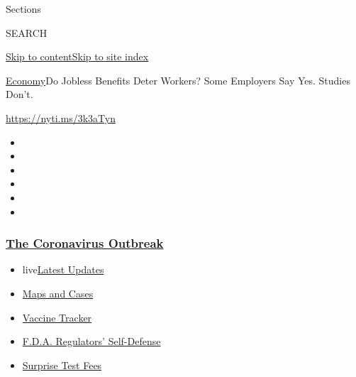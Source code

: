 Sections

SEARCH

\protect\hyperlink{site-content}{Skip to
content}\protect\hyperlink{site-index}{Skip to site index}

\href{/section/business/economy}{Economy}\textbar{}Do Jobless Benefits
Deter Workers? Some Employers Say Yes. Studies Don't.

\url{https://nyti.ms/3k3aTyn}

\begin{itemize}
\item
\item
\item
\item
\item
\item
\end{itemize}

\hypertarget{the-coronavirus-outbreak}{%
\subsubsection{\texorpdfstring{\href{https://www.nytimes3xbfgragh.onion/news-event/coronavirus?name=styln-coronavirus-markets\&region=TOP_BANNER\&block=storyline_menu_recirc\&action=click\&pgtype=Article\&impression_id=52916d50-f52c-11ea-a92a-d1075f6219dd\&variant=undefined}{The
Coronavirus
Outbreak}}{The Coronavirus Outbreak}}\label{the-coronavirus-outbreak}}

\begin{itemize}
\tightlist
\item
  live\href{https://www.nytimes3xbfgragh.onion/2020/09/12/world/covid-19-coronavirus.html?name=styln-coronavirus-markets\&region=TOP_BANNER\&block=storyline_menu_recirc\&action=click\&pgtype=Article\&impression_id=52919460-f52c-11ea-a92a-d1075f6219dd\&variant=undefined}{Latest
  Updates}
\item
  \href{https://www.nytimes3xbfgragh.onion/interactive/2020/us/coronavirus-us-cases.html?name=styln-coronavirus-markets\&region=TOP_BANNER\&block=storyline_menu_recirc\&action=click\&pgtype=Article\&impression_id=52919461-f52c-11ea-a92a-d1075f6219dd\&variant=undefined}{Maps
  and Cases}
\item
  \href{https://www.nytimes3xbfgragh.onion/interactive/2020/science/coronavirus-vaccine-tracker.html?name=styln-coronavirus-markets\&region=TOP_BANNER\&block=storyline_menu_recirc\&action=click\&pgtype=Article\&impression_id=52919462-f52c-11ea-a92a-d1075f6219dd\&variant=undefined}{Vaccine
  Tracker}
\item
  \href{https://www.nytimes3xbfgragh.onion/2020/09/10/us/politics/fda-coronavirus-vaccine.html?name=styln-coronavirus-markets\&region=TOP_BANNER\&block=storyline_menu_recirc\&action=click\&pgtype=Article\&impression_id=52919463-f52c-11ea-a92a-d1075f6219dd\&variant=undefined}{F.D.A.
  Regulators' Self-Defense}
\item
  \href{https://www.nytimes3xbfgragh.onion/2020/09/09/upshot/coronavirus-surprise-test-fees.html?name=styln-coronavirus-markets\&region=TOP_BANNER\&block=storyline_menu_recirc\&action=click\&pgtype=Article\&impression_id=52919464-f52c-11ea-a92a-d1075f6219dd\&variant=undefined}{Surprise
  Test Fees}
\end{itemize}

